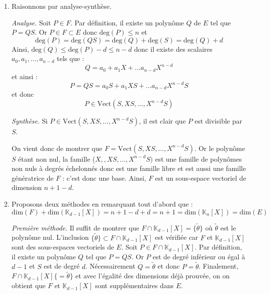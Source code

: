 \documentclass[a4paper,10pt]{report}
\begin{document}
\corr \begin{enumerate}
\item Raisonnons par analyse-synthèse.

\medskip

\noindent \textit{Analyse.} Soit $P \in F$. Par définition, il existe un polynôme $Q$ de $E$ tel que $P=QS$. Or $P \in F \subset E$ donc $\textrm{deg}(P) \leq n$ et 
$$ \textrm{deg}(P) = \textrm{deg}(QS) = \textrm{deg}(Q) + \textrm{deg}(S) = \textrm{deg}(Q) + d$$
Ainsi, $\textrm{deg}(Q) \leq \textrm{deg}(P) - d \leq n-d$ donc il existe des scalaires $a_0, a_1, \ldots, a_{n-d}$ tels que :
$$ Q = a_0 + a_1X+ \ldots a_{n-d} X^{n-d}$$
et ainsi :
$$ P = QS = a_0 S + a_1XS+ \ldots a_{n-d} X^{n-d}S$$
et donc 
$$ P \in \textrm{Vect}(S,XS,\ldots, X^{n-d}S)$$

\medskip

\noindent \textit{Synthèse.} Si $P \in \textrm{Vect}(S,XS,\ldots, X^{n-d}S)$, il est clair que $P$ est divisible par $S$.

\medskip

\noindent On vient donc de montrer que $F= \textrm{Vect}(S,XS,\ldots, X^{n-d}S)$. Or le polynôme $S$ étant non nul, la famille ($X,,XS,\ldots, X^{n-d}S)$ est une famille de polynômes non nuls à degrés échelonnés donc est une famille libre et est aussi une famille génératrice de $F$ : c'est donc une base. Ainsi, $F$ est un sous-espace vectoriel de dimension $n+1-d$.
\item Proposons deux méthodes en remarquant tout d'abord que :
$$ \textrm{dim}(F) + \textrm{dim}(\mathbb{K}_{d-1}[X]) = n+1-d +d = n+1 =  \textrm{dim}(\mathbb{K}_{n}[X]) =  \textrm{dim}(E)$$

\medskip

\noindent \textit{Première méthode.}  Il suffit de montrer que $F \cap \mathbb{K}_{d-1}[X] =\lbrace \tilde{\theta} \rbrace$ où $\tilde{\theta}$ est le polynôme nul. L'inclusion  $\lbrace \tilde{\theta} \rbrace \subset F \cap \mathbb{K}_{d-1}[X]$ est vérifiée car $F$ et $\mathbb{K}_{d-1}[X]$ sont des sous-espaces vectoriels de $E$. Soit $P \in F \cap \mathbb{K}_{d-1}[X]$. Par définition, il existe un polynôme $Q$ tel que $P = QS$. Or $P$ est de degré inférieur ou égal à $d-1$ et $S$ est de degré $d$. Nécessairement $Q= \tilde{\theta}$ et donc $P= \tilde{\theta}$. Finalement, $F \cap \mathbb{K}_{d-1}[X] \lbrace = \tilde{\theta} \rbrace$ et avec l'égalité des dimensions déjà prouvée, on on obtient que $F$ et $\mathbb{K}_{d-1}[X]$ sont supplémentaires dans $E$.

\medskip


\end{enumerate}
\end{document}
